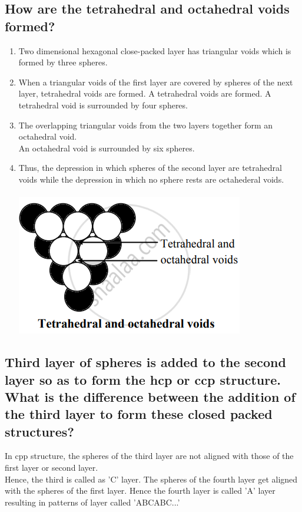 \documentclass{article}
\begin{document}
   \subsection{How are the tetrahedral and octahedral voids formed?}

   \begin{enumerate}
	\item Two dimensional hexagonal close-packed layer has
	triangular voids which is formed by three spheres.
	\item When a triangular voids of the first layer are covered by
	spheres of the next layer, tetrahedral voids are formed.
	A tetrahedral voids are formed. A tetrahedral void is 
	surrounded by four spheres.
	\item The overlapping triangular voids from the two layers
	together form an octahedral void.\\
	An octahedral void is surrounded by six spheres.
   	\item Thus, the depression in which spheres of the second layer
	are tetrahedral voids while the depression in which no sphere
	rests are octahederal voids.\\\\
	\includegraphics[scale=1.5]{voids}
   \end{enumerate}

   \subsection{Third layer of spheres is added to the second layer so
   as to form the hcp or ccp structure. What is the difference between
   the addition of the third layer to form these closed packed
   structures?}

   In cpp structure, the spheres of the third layer are not aligned
   with those of the first layer or second layer.\\
   Hence, the third is called as 'C' layer. The spheres of the fourth
   layer get aligned with the spheres of the first layer. Hence the
   fourth layer is called 'A' layer resulting in patterns of layer
   called 'ABCABC...'
\end{document}
